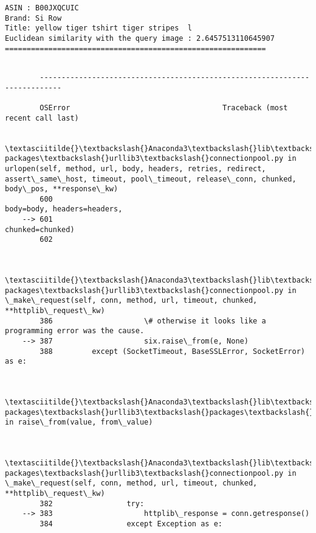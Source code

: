 \documentclass[11pt]{article}
\begin{document}
    \begin{Verbatim}[commandchars=\\\{\}]
ASIN : B00JXQCUIC
Brand: Si Row
Title: yellow tiger tshirt tiger stripes  l 
Euclidean similarity with the query image : 2.6457513110645907
============================================================

    \end{Verbatim}

    \begin{Verbatim}[commandchars=\\\{\}]

        ---------------------------------------------------------------------------

        OSError                                   Traceback (most recent call last)

        \textasciitilde{}\textbackslash{}Anaconda3\textbackslash{}lib\textbackslash{}site-packages\textbackslash{}urllib3\textbackslash{}connectionpool.py in urlopen(self, method, url, body, headers, retries, redirect, assert\_same\_host, timeout, pool\_timeout, release\_conn, chunked, body\_pos, **response\_kw)
        600                                                   body=body, headers=headers,
    --> 601                                                   chunked=chunked)
        602 
    

        \textasciitilde{}\textbackslash{}Anaconda3\textbackslash{}lib\textbackslash{}site-packages\textbackslash{}urllib3\textbackslash{}connectionpool.py in \_make\_request(self, conn, method, url, timeout, chunked, **httplib\_request\_kw)
        386                     \# otherwise it looks like a programming error was the cause.
    --> 387                     six.raise\_from(e, None)
        388         except (SocketTimeout, BaseSSLError, SocketError) as e:
    

        \textasciitilde{}\textbackslash{}Anaconda3\textbackslash{}lib\textbackslash{}site-packages\textbackslash{}urllib3\textbackslash{}packages\textbackslash{}six.py in raise\_from(value, from\_value)
    

        \textasciitilde{}\textbackslash{}Anaconda3\textbackslash{}lib\textbackslash{}site-packages\textbackslash{}urllib3\textbackslash{}connectionpool.py in \_make\_request(self, conn, method, url, timeout, chunked, **httplib\_request\_kw)
        382                 try:
    --> 383                     httplib\_response = conn.getresponse()
        384                 except Exception as e:
    


\end{Verbatim}
\end{document}
